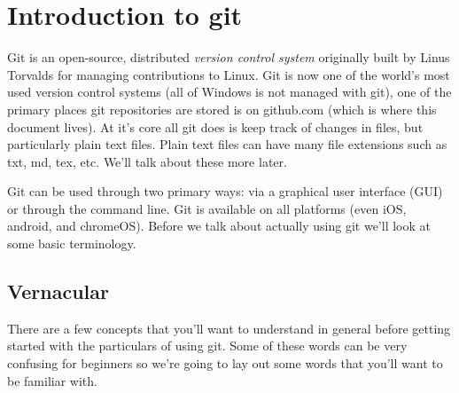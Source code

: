 \section{Introduction to git}

Git is an open-source, distributed \textit{version control system} originally built by Linus Torvalds for managing contributions to Linux. Git is now one of the world's most used version control systems (all of Windows is not managed with git), one of the primary places git repositories are stored is on github.com (which is where this document lives). At it's core all git does is keep track of changes in files, but particularly plain text files. Plain text files can have many file extensions such as txt, md, tex, etc. We'll talk about these more later.

Git can be used through two primary ways: via a graphical user interface (GUI) or through the command line. Git is available on all platforms (even iOS, android, and chromeOS). Before we talk about actually using git we'll look at some basic terminology.


\subsection{Vernacular}

There are a few concepts that you'll want to understand in general before getting started with the particulars of using git. Some of these words can be very confusing for beginners so we're going to lay out some words that you'll want to be familiar with.

